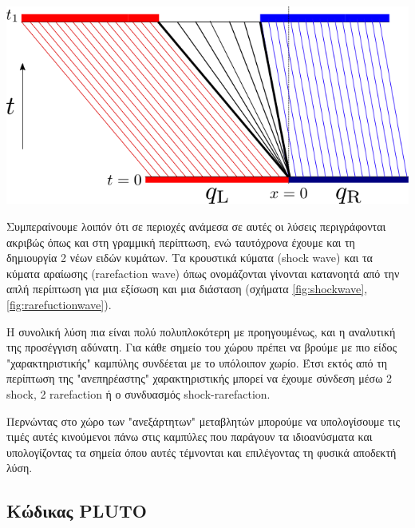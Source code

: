 \begin{marginfigure}
	\centering
	\includegraphics[width=1\linewidth]{Images/rarefuctionwave}
	\caption{}
	\label{fig:rarefuctionwave}
\end{marginfigure}

Συμπεραίνουμε λοιπόν ότι σε περιοχές ανάμεσα σε αυτές οι λύσεις περιγράφονται ακριβώς όπως και στη γραμμική περίπτωση, ενώ ταυτόχρονα έχουμε και τη δημιουργία 2 νέων ειδών κυμάτων. Τα κρουστικά κύματα (shock wave) και τα κύματα αραίωσης (rarefaction wave) όπως ονομάζονται γίνονται κατανοητά από την απλή περίπτωση για μια εξίσωση και μια διάσταση (σχήματα \ref{fig:shockwave}, \ref{fig:rarefuctionwave}). 

Η συνολική λύση πια είναι πολύ πολυπλοκότερη με προηγουμένως, και η αναλυτική της προσέγγιση αδύνατη. Για κάθε σημείο του χώρου πρέπει να βρούμε με πιο είδος "χαρακτηριστικής" καμπύλης συνδέεται με το υπόλοιπον χωρίο. Έτσι εκτός από τη περίπτωση της "ανεπηρέαστης" χαρακτηριστικής μπορεί να έχουμε σύνδεση μέσω 2 shock, 2 rarefaction ή ο συνδυασμός shock-rarefaction.

Περνώντας στο χώρο των "ανεξάρτητων" μεταβλητών μπορούμε να υπολογίσουμε τις τιμές αυτές κινούμενοι πάνω στις καμπύλες που παράγουν τα ιδιοανύσματα και υπολογίζοντας τα σημεία όπου αυτές τέμνονται και επιλέγοντας τη φυσικά αποδεκτή λύση.



\subsection{Κώδικας PLUTO}

